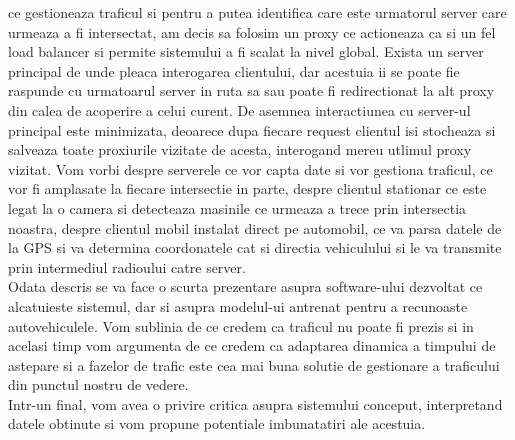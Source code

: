 \documentclass[17pt]{report}
\begin{document}
ce gestioneaza traficul si pentru a putea identifica care este 
urmatorul server care urmeaza a fi intersectat, am decis sa folosim 
un proxy ce actioneaza ca si un fel load balancer si permite
sistemului a fi scalat la nivel global. Exista un server principal
de unde pleaca interogarea clientului, dar acestuia ii se poate fie raspunde cu 
urmatoarul server in ruta sa sau poate fi redirectionat la alt proxy 
din calea de acoperire a celui curent. De asemnea interactiunea cu server-ul
principal este minimizata, deoarece dupa fiecare request clientul isi stocheaza 
si salveaza toate proxiurile vizitate de acesta, interogand mereu utlimul 
proxy vizitat. Vom vorbi despre serverele ce vor capta 
date si vor gestiona traficul, ce vor fi amplasate la fiecare intersectie 
in parte, despre clientul stationar ce este legat la o camera si
detecteaza masinile ce urmeaza a trece prin intersectia noastra, despre 
clientul mobil instalat direct pe automobil, ce va parsa datele de la
GPS si va determina coordonatele cat si directia vehiculului si le va 
transmite prin intermediul radioului catre server. \\
\indent \indent 
Odata descris se va face o scurta prezentare asupra software-ului 
dezvoltat ce alcatuieste sistemul, dar si asupra modelul-ui antrenat
pentru a recunoaste autovehiculele. Vom sublinia de ce credem ca
traficul nu poate fi prezis si in acelasi timp vom argumenta de ce
credem ca adaptarea dinamica a timpului de astepare si a fazelor de trafic
este cea mai buna solutie de gestionare a traficului din punctul nostru 
de vedere.\\
\indent \indent
Intr-un final, vom avea o privire critica asupra sistemului conceput, 
interpretand datele obtinute si vom propune potentiale imbunatatiri
ale acestuia.
\pagebreak

\tableofcontents


\listoffigures
\pagebreak
\end{document}
